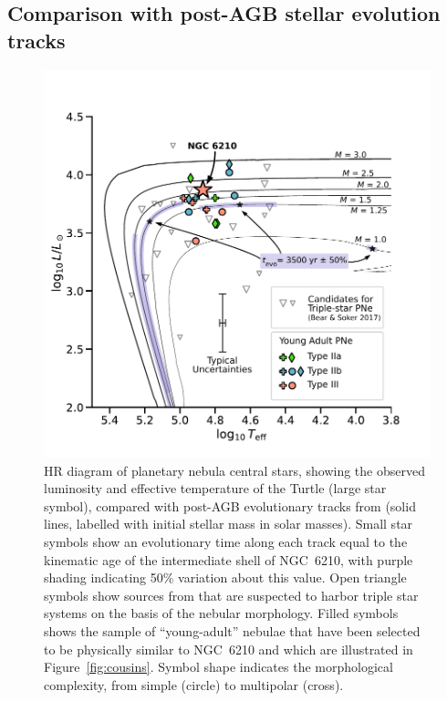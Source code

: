 \documentclass[useAMS, usenatbib]{mnras}
\begin{document}
\subsection{Comparison with post-AGB stellar evolution tracks}
\label{sec:comparison-with-post}
\begin{figure}
  \centering
  \includegraphics[width=\linewidth]{figs/hr-pne-annotated}
  \caption{
    HR diagram of planetary nebula central stars,
    showing the observed luminosity and effective temperature of the Turtle
    (large star symbol),
    compared with post-AGB evolutionary tracks from
    \citet{Miller-Bertolami:2016a}
    (solid lines, labelled with initial stellar mass in solar masses).
    Small star symbols show an evolutionary time along each track equal
    to the kinematic age of the intermediate shell of NGC~6210,
    with purple shading indicating 50\% variation about this value.
    Open triangle symbols show sources from \citet{Bear:2017a}
    that are suspected to harbor triple star systems on the basis of the nebular morphology.
    Filled symbols shows the sample of ``young-adult'' nebulae
    that have been selected to be physically similar to NGC~6210
    and which are illustrated in Figure~\ref{fig:cousins}.
    Symbol shape indicates the morphological complexity, from simple (circle) to multipolar (cross).
  }
  \label{fig:hr-diagram}
\end{figure}
\end{document}
